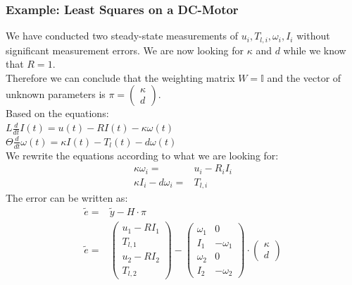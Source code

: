 \documentclass[10pt,a4paper]{scrartcl}
\begin{document}
\begin{multicols*}{3}
\vfill
\null
\columnbreak

\subsubsection{Example: Least Squares on a DC-Motor}
We have conducted two steady-state measurements of $u_i,T_{l,i},\omega_i,I_i$ without significant measurement errors.
We are now looking for $\kappa$ and $d$ while we know that $R=1$.\\

Therefore we can conclude that the weighting matrix $W=\mathbb{I}$ and the vector of unknown parameters is $\pi=\begin{pmatrix} \kappa \\d\end{pmatrix}$.\\

Based on the equations:\\
$L\frac{d}{dt}I(t)=u(t)-RI(t)-\kappa \omega(t)$\\
$\Theta \frac{d}{dt}\omega(t)=\kappa I(t)-T_l(t)-d\omega(t)$\\
We rewrite the equations according to what we are looking for:
\begin{align*}
\kappa\omega_i =&u_i-R_iI_i\\
\kappa I_i-d\omega_i =&T_{l,i}
\end{align*}
The error can be written as:
\begin{align*}
\tilde e =&\tilde y - H \cdot \pi\\
\tilde e =&\begin{pmatrix} u_1-RI_1\\T_{l,1}\\u_2-RI_2\\T_{l,2}\end{pmatrix}-\begin{pmatrix} \omega_1&0\\I_1 &-\omega_1\\ \omega_2&0\\I_2 &-\omega_2\end{pmatrix}\cdot\begin{pmatrix} \kappa \\d\end{pmatrix}
\end{align*}



\end{multicols*}
\end{document}
